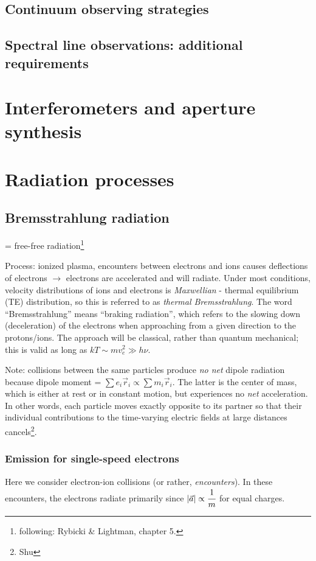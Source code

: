 \documentclass[12pt]{article}
\newcommand{\mar}[1]{\hspace{0pt}\marginpar{-\textcolor{black}{#1}-}}
\begin{document}
\subsection{Continuum observing strategies}
\subsection{Spectral line observations: additional requirements}

\newpage
\section{Interferometers and aperture synthesis}

\newpage
\section{Radiation processes}
\mar{145}
\subsection{Bremsstrahlung radiation}
= free-free radiation\footnote{following: Rybicki \& Lightman, chapter 5.}

Process: ionized plasma, encounters between electrons and ions causes deflections
of electrons $\rightarrow$ electrons are accelerated and will radiate.
Under most conditions, velocity distributions of ions and electrons is
\textit{Maxwellian} - thermal equilibrium (TE) distribution, so this is referred
to as \textit{thermal Bremsstrahlung}. The word ``Bremsstrahlung'' means
``braking radiation'', which refers to the slowing down (deceleration) of the
electrons when approaching from a given direction to the protons/ions. The approach
will be classical, rather than quantum mechanical; this is valid as long as
$ kT \sim mv_{e}^{2} \gg h\nu$.

Note: collisions between the same particles produce \emph{no net} dipole radiation
because dipole moment = $\sum{e_{i}\vec{r}_{i}} \propto \sum{m_{i}\vec{r}_{i}}$.
The latter is the center of mass, which is either at rest or in constant motion,
but experiences no \emph{net} acceleration. In other words, each particle moves
exactly opposite to its partner so that their individual contributions to the
time-varying electric fields at large distances cancels\footnote{Shu}.

\subsubsection{Emission for single-speed electrons}
\mar{146}
Here we consider electron-ion collisions (or rather, \emph{encounters}).
In these encounters, the electrons radiate primarily since
$ |\vec{a}| \propto \cfrac{1}{m} $ for equal charges.
\end{document}
